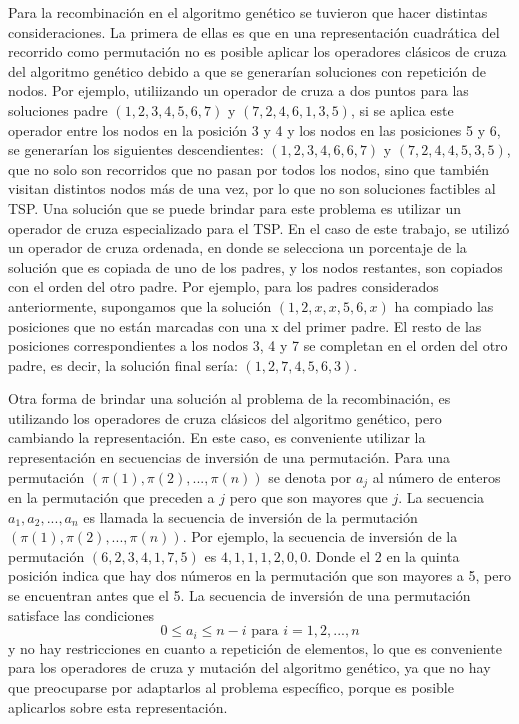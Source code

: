 \par Para la recombinación en el algoritmo genético se tuvieron que hacer distintas consideraciones. La primera de ellas es que en una representación cuadrática del recorrido como permutación no es posible aplicar los operadores clásicos de cruza del algoritmo genético debido a que se generarían soluciones con repetición de nodos. Por ejemplo, utiliizando un operador de cruza a dos puntos para las soluciones padre $(1, 2, 3, 4, 5, 6, 7)$ y $(7, 2, 4, 6, 1, 3, 5)$, si se aplica este operador entre los nodos en la posición 3 y 4 y los nodos en las posiciones 5 y 6, se generarían los siguientes descendientes: $(1, 2, 3, 4, 6, 6, 7)$ y $(7, 2, 4, 4, 5, 3, 5)$, que no solo son recorridos que no pasan por todos los nodos, sino que también visitan distintos nodos más de una vez, por lo que no son soluciones factibles al TSP. Una solución que se puede brindar para este problema es utilizar un operador de cruza especializado para el TSP. En el caso de este trabajo, se utilizó un operador de cruza ordenada, en donde se selecciona un porcentaje de la solución que es copiada de uno de los padres, y los nodos restantes, son copiados con el orden del otro padre. Por ejemplo, para los padres considerados anteriormente, supongamos que la solución $(1, 2, x, x, 5, 6, x)$ ha compiado las posiciones que no están marcadas con una x del primer padre. El resto de las posiciones correspondientes a los nodos 3, 4 y 7 se completan en el orden del otro padre, es decir, la solución final sería: $(1, 2, 7, 4, 5, 6, 3)$.
\par Otra forma de brindar una solución al problema de la recombinación, es utilizando los operadores de cruza clásicos del algoritmo genético, pero cambiando la representación. En este caso, es conveniente utilizar la representación en secuencias de inversión de una permutación. Para una permutación $(\pi(1), \pi(2), ..., \pi(n))$ se denota por $a_j$ al número de enteros en la permutación que preceden a $j$ pero que son mayores que $j$. La secuencia $a_1, a_2, ..., a_n$ es llamada la secuencia de inversión de la permutación $(\pi(1), \pi(2), ..., \pi(n))$. Por ejemplo, la secuencia de inversión de la permutación $(6, 2, 3, 4, 1, 7, 5)$ es $4, 1, 1, 1, 2, 0, 0$. Donde el $2$ en la quinta posición indica que hay dos números en la permutación que son mayores a 5, pero se encuentran antes que el 5. La secuencia de inversión de una permutación satisface las condiciones 
$$
	0\leq a_i\leq n-i \text{ para } i=1, 2, ..., n
$$
y no hay restricciones en cuanto a repetición de elementos, lo que es conveniente para los operadores de cruza y mutación del algoritmo genético, ya que no hay que preocuparse por adaptarlos al problema específico, porque es posible aplicarlos sobre esta representación.

